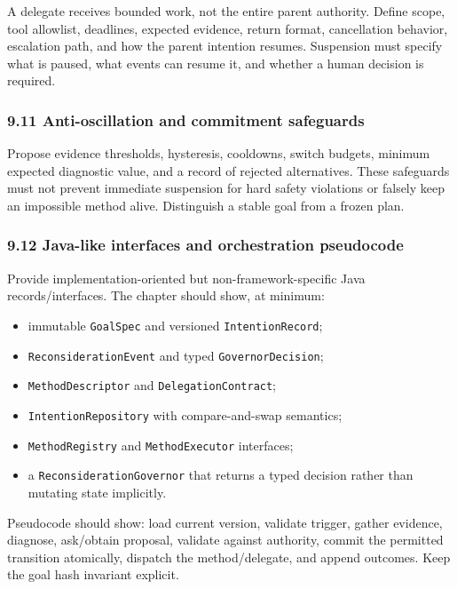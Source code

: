 A delegate receives bounded work, not the entire parent authority. Define scope, tool allowlist, deadlines, expected evidence, return format, cancellation behavior, escalation path, and how the parent intention resumes. Suspension must specify what is paused, what events can resume it, and whether a human decision is required.

\subsubsection{9.11 Anti-oscillation and commitment safeguards}\label{anti-oscillation-and-commitment-safeguards}

Propose evidence thresholds, hysteresis, cooldowns, switch budgets, minimum expected diagnostic value, and a record of rejected alternatives. These safeguards must not prevent immediate suspension for hard safety violations or falsely keep an impossible method alive. Distinguish a stable goal from a frozen plan.

\subsubsection{9.12 Java-like interfaces and orchestration pseudocode}\label{java-like-interfaces-and-orchestration-pseudocode}

Provide implementation-oriented but non-framework-specific Java records/interfaces. The chapter should show, at minimum:

\begin{itemize}
\tightlist
\item
  immutable \texttt{GoalSpec} and versioned \texttt{IntentionRecord};
\item
  \texttt{ReconsiderationEvent} and typed \texttt{GovernorDecision};
\item
  \texttt{MethodDescriptor} and \texttt{DelegationContract};
\item
  \texttt{IntentionRepository} with compare-and-swap semantics;
\item
  \texttt{MethodRegistry} and \texttt{MethodExecutor} interfaces;
\item
  a \texttt{ReconsiderationGovernor} that returns a typed decision rather than mutating state implicitly.
\end{itemize}

Pseudocode should show: load current version, validate trigger, gather evidence, diagnose, ask/obtain proposal, validate against authority, commit the permitted transition atomically, dispatch the method/delegate, and append outcomes. Keep the goal hash invariant explicit.

